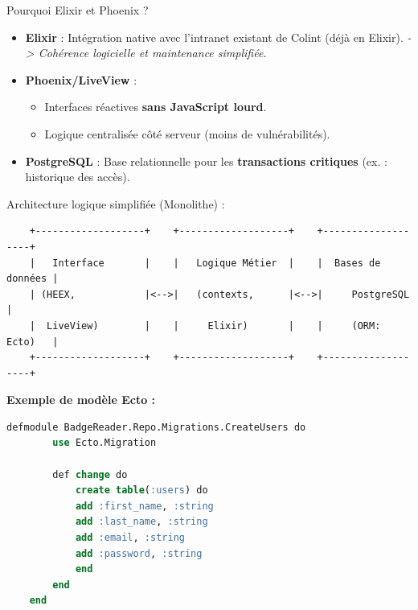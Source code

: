 \begin{for_you}{Pourquoi Elixir et Phoenix ?}
    \begin{itemize}
        \item \textbf{Elixir} :
              Intégration native avec l’intranet existant de Colint (déjà en Elixir).
              \textit{-> Cohérence logicielle et maintenance simplifiée.}

        \item \textbf{Phoenix/LiveView} :
              \begin{itemize}
                  \item Interfaces réactives \textbf{sans JavaScript lourd}.
                  \item Logique centralisée côté serveur (moins de vulnérabilités).
              \end{itemize}

        \item \textbf{PostgreSQL} :
              Base relationnelle pour les \textbf{transactions critiques} (ex. : historique des accès).
    \end{itemize}
\end{for_you}

\begin{for_you}{Architecture logique simplifiée (Monolithe) :}

    \begin{verbatim}
    +-------------------+    +-------------------+    +-------------------+
    |   Interface       |    |   Logique Métier  |    |  Bases de données |
    | (HEEX,            |<-->|   (contexts,      |<-->|     PostgreSQL    |
    |  LiveView)        |    |     Elixir)       |    |     (ORM: Ecto)   |
    +-------------------+    +-------------------+    +-------------------+
    \end{verbatim}

    \textbf{Exemple de modèle Ecto :}
    \begin{lstlisting}[language=SQL]
    defmodule BadgeReader.Repo.Migrations.CreateUsers do
        use Ecto.Migration

        def change do
            create table(:users) do
            add :first_name, :string
            add :last_name, :string
            add :email, :string
            add :password, :string
            end
        end
    end

    \end{lstlisting}
\end{for_you}

